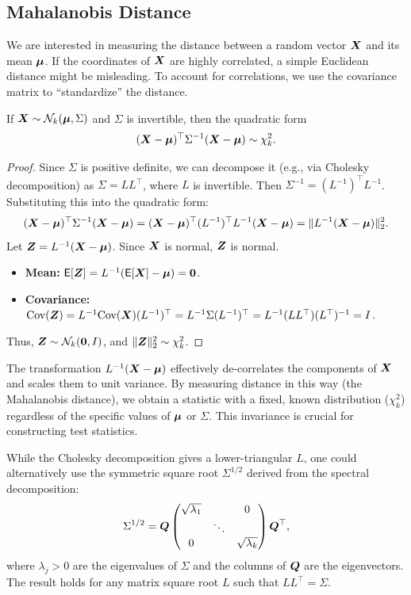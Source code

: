 \subsection{Mahalanobis Distance}
We are interested in measuring the distance between a random vector $\boldsymbol{X}$ and its mean $\boldsymbol{\mu}$. If the coordinates of $\boldsymbol{X}$ are highly correlated, a simple Euclidean distance might be misleading. To account for correlations, we use the covariance matrix to ``standardize'' the distance.

\begin{lemma}
\label{lem:mahalanobis}
If $\boldsymbol{X} \sim \mathcal{N}_{k}(\boldsymbol{\mu}, \Sigma)$ and $\Sigma$ is invertible, then the quadratic form
\[
    (\boldsymbol{X} - \boldsymbol{\mu})^{\top} \Sigma^{-1} (\boldsymbol{X} - \boldsymbol{\mu}) \sim \chi^2_{k}.
\]
\end{lemma}

\begin{proof}
    Since $\Sigma$ is positive definite, we can decompose it (e.g., via Cholesky decomposition) as $\Sigma = L L^{\top}$, where $L$ is invertible. Then $\Sigma^{-1} = (L^{-1})^{\top} L^{-1}$. Substituting this into the quadratic form:
    \[
        (\boldsymbol{X} - \boldsymbol{\mu})^{\top} \Sigma^{-1} (\boldsymbol{X} - \boldsymbol{\mu}) = (\boldsymbol{X} - \boldsymbol{\mu})^{\top} (L^{-1})^{\top} L^{-1} (\boldsymbol{X} - \boldsymbol{\mu}) = \| L^{-1}(\boldsymbol{X} - \boldsymbol{\mu}) \|^2_{2}.
    \]
    Let $\boldsymbol{Z} = L^{-1}(\boldsymbol{X} - \boldsymbol{\mu})$. Since $\boldsymbol{X}$ is normal, $\boldsymbol{Z}$ is normal.
    \begin{itemize}
        \item \textbf{Mean:} $\mathsf{E}[\boldsymbol{Z}] = L^{-1}(\mathsf{E}[\boldsymbol{X}] - \boldsymbol{\mu}) = \boldsymbol{0}$.
        \item \textbf{Covariance:} $\text{Cov}(\boldsymbol{Z}) = L^{-1} \text{Cov}(\boldsymbol{X}) (L^{-1})^{\top} = L^{-1} \Sigma (L^{-1})^{\top} = L^{-1} (L L^{\top}) (L^{\top})^{-1} = I$.
    \end{itemize}
    Thus, $\boldsymbol{Z} \sim \mathcal{N}_{k}(\boldsymbol{0}, I)$, and $\|\boldsymbol{Z}\|^2_{2} \sim \chi^2_{k}$.
\end{proof}

The transformation $L^{-1}(\boldsymbol{X}-\boldsymbol{\mu})$ effectively de-correlates the components of $\boldsymbol{X}$ and scales them to unit variance. By measuring distance in this way (the Mahalanobis distance), we obtain a statistic with a fixed, known distribution ($\chi^2_k$) regardless of the specific values of $\boldsymbol{\mu}$ or $\Sigma$. This invariance is crucial for constructing test statistics.

\begin{remark}
    While the Cholesky decomposition gives a lower-triangular $L$, one could alternatively use the symmetric square root $\Sigma^{1/2}$ derived from the spectral decomposition:
    \[
        \Sigma^{1/2} = \boldsymbol{Q} \begin{pmatrix} \sqrt{\lambda_1} & & 0 \\ & \ddots & \\ 0 & & \sqrt{\lambda_{k}} \end{pmatrix} \boldsymbol{Q}^{\top},
    \]
    where $\lambda_{j} > 0$ are the eigenvalues of $\Sigma$ and the columns of $\boldsymbol{Q}$ are the eigenvectors. The result holds for any matrix square root $L$ such that $LL^\top = \Sigma$.
\end{remark}

